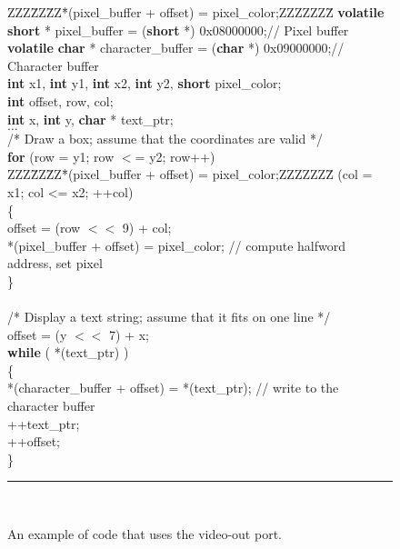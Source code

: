 \begin{figure}[h!]
\begin{center}
\begin{minipage}[t]{12.5 cm}
\begin{tabbing}
ZZZ\=ZZ\=ZZ\=*(pixel\_buffer + offset) = pixel\_color;ZZZZZZZ\= \kill
{\bf volatile} {\bf short} * pixel\_buffer = ({\bf short} *) 0x08000000;\>\>\>\>// Pixel buffer\\
{\bf volatile} {\bf char} * character\_buffer = ({\bf char} *) 0x09000000;\>\>\>\>// Character buffer\\
{\bf int} x1, {\bf int} y1, {\bf int} x2, {\bf int} y2, {\bf short} pixel\_color;\\
{\bf int} offset, row, col;\\
{\bf int} x, {\bf int} y, {\bf char} * text\_ptr;\\
$\ldots$\\
/* Draw a box; assume that the coordinates are valid */\\
{\bf for} (row = y1; row $<$= y2; row++)\\
ZZZ\=ZZ\=ZZ\=*(pixel\_buffer + offset) = pixel\_color;ZZZZZZZ\= \kill
{} (col = x1; col <= x2; ++col)\\
\>\{\\
\>\>offset = (row $<<$ 9) + col;\\
\>\>*(pixel\_buffer + offset) = pixel\_color;	\>\>// compute halfword address, set pixel\\
\>\}\\
\\
/* Display a text string; assume that it fits on one line */\\
offset = (y $<<$ 7) + x;\\
{\bf while} ( *(text\_ptr) )\\
\{\\
\>*(character\_buffer + offset) = *(text\_ptr);	\>\>\>// write to the character buffer\\
\>++text\_ptr;\\
\>++offset;\\
\}\rule{6.0in}{0in}~\\
\end{tabbing}
\end{minipage}
\end{center}
	\vspace{-0.33in}\caption{An example of code that uses the video-out port.}
   \label{fig:video_C}
\end{figure}
